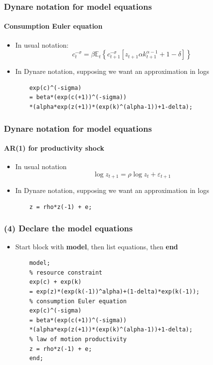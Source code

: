 \documentclass{beamer}
\begin{document}
\begin{frame}[fragile]
\frametitle{Dynare notation for model equations}
\framesubtitle{Consumption Euler equation}
\begin{itemize}
	\item In usual notation:
	$$
	c_{t}^{-\sigma}=\beta \mathbb{E}_{t}\left\{c_{t+1}^{-\sigma}\left[z_{t+1} \alpha k_{t+1}^{\alpha-1}+1-\delta\right]\right\}
	$$
	\item In Dynare notation, supposing we want an approximation in logs
	
	\begin{verbatim}
	exp(c)^(-sigma)
	= beta*(exp(c(+1))^(-sigma))
	*(alpha*exp(z(+1))*(exp(k)^(alpha-1))+1-delta);
	\end{verbatim}
	
\end{itemize}
\end{frame}

\begin{frame}[fragile]
\frametitle{Dynare notation for model equations}
\framesubtitle{AR(1) for productivity shock}
\begin{itemize}
	\item In usual notation
	$$
	\log z_{t+1}=\rho \log z_{t}+\varepsilon_{t+1}
	$$
	\item In Dynare notation, supposing we want an approximation in logs
	
	\begin{verbatim}
	z = rho*z(-1) + e;
	\end{verbatim}
	
\end{itemize}
\end{frame}

\begin{frame}[fragile]
\frametitle{(4) Declare the model equations}
\begin{itemize}
	\item Start block with \textbf{model}, then list equations, then \textbf{end}
	
	\begin{verbatim}
	model;
	% resource constraint
	exp(c) + exp(k)
	= exp(z)*(exp(k(-1))^alpha)+(1-delta)*exp(k(-1));
	% consumption Euler equation
	exp(c)^(-sigma)
	= beta*(exp(c(+1))^(-sigma))
	*(alpha*exp(z(+1))*(exp(k)^(alpha-1))+1-delta);
	% law of motion productivity
	z = rho*z(-1) + e;
	end;
	\end{verbatim}
	
	
\end{itemize}
\end{frame}
\end{document}
